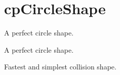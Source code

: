\hypertarget{group__cp_circle_shape}{}\section{cp\+Circle\+Shape}
\label{group__cp_circle_shape}


A perfect circle shape.  


A perfect circle shape. 

Fastest and simplest collision shape. 